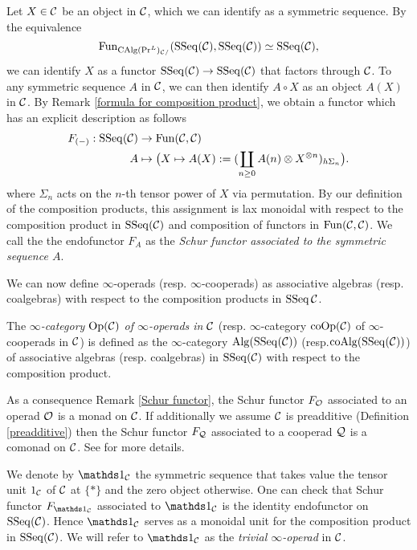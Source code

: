 \begin{remark}
\label{Schur functor}
Let $X \in {\mathcal{C}}$ be an object in ${\mathcal{C}}$, which we can identify as a symmetric sequence.
By the equivalence
$$
\operatorname{Fun}_{\operatorname{CAlg}(\Pr^L)_{{\mathcal{C}}/}}(\operatorname{SSeq}({\mathcal{C}}),\operatorname{SSeq}({\mathcal{C}}))
\simeq
\operatorname{SSeq}({\mathcal{C}}),
$$
we can identify $X$ as a functor $\operatorname{SSeq}({\mathcal{C}}) \to \operatorname{SSeq}({\mathcal{C}})$ that factors through ${\mathcal{C}}$.
To any symmetric sequence $A$ in ${\mathcal{C}}$,  we can then identify $A\circ X$ as an object $A(X)$ in ${\mathcal{C}}$.
By Remark \ref{formula for composition product}, we obtain a functor which has an explicit description as follows
\begin{align*}
		F_{(-)}: \operatorname{SSeq}({\mathcal{C}}) & \rightarrow \operatorname{Fun}({\mathcal{C}},{\mathcal{C}})\\
	A        & \mapsto \big( X\mapsto  A(X):=(\coprod_{n\geq 0} A(n)\otimes X^{\otimes n})_{h\Sigma_n}\big).
\end{align*}
where $\Sigma_n$ acts on the $n$-th tensor power of $X$ via permutation.
By our definition of the composition products, this assignment is lax monoidal with respect to the composition product in $\operatorname{SSeq}({\mathcal{C}})$ and composition of functors in $\operatorname{Fun}({\mathcal{C}},{\mathcal{C}})$.
We call the the endofunctor $F_A$ as the \emph{Schur functor associated to the symmetric sequence $A$}.
\end{remark}

We can now define $\infty$-operads (resp. $\infty$-cooperads) as associative algebras (resp. coalgebras) with respect to the composition products in $\operatorname{SSeq}{{\mathcal{C}}}$.
\begin{definition}
	\label{inf operads}
	The \emph{$\infty$-category $\operatorname{Op}({\mathcal{C}})$ of $\infty$-operads in ${\mathcal{C}}$} (resp. $\infty$-category $\operatorname{coOp}({\mathcal{C}})$ of $\infty$-cooperads in ${\mathcal{C}}$) is defined as the $\infty$-category $\operatorname{Alg}(\operatorname{SSeq}({\mathcal{C}}))$ (resp.$\operatorname{coAlg}(\operatorname{SSeq}({\mathcal{C}}))$) of associative algebras (resp. coalgebras) in $\operatorname{SSeq}({\mathcal{C}})$ with respect to the composition product.
\end{definition}

\begin{remark}
\label{Schur functor and operads}
As a consequence Remark \ref{Schur functor}, the Schur functor $F_{\mathcal{O}}$ associated to an operad ${\mathcal{O}}$ is a monad on ${\mathcal{C}}$.
If additionally we assume ${\mathcal{C}}$ is preadditive (Definition \ref{preadditive})
then the Schur functor $F_{\mathcal{Q}}$ associated to a cooperad ${\mathcal{Q}}$ is a comonad on ${\mathcal{C}}$. See \cite[Remark 2.21]{ChingBar} for more details.
\end{remark}

\begin{example}
    	We denote by $\triv_{\CC}$ the symmetric sequence that takes value the tensor unit $1_{\mathcal{C}}$ of ${\mathcal{C}}$ at $\{*\}$ and the zero object otherwise. One can check that Schur functor $F_{\triv_{\CC}}$ associated to $\triv_{\CC}$ is the identity endofunctor on $\operatorname{SSeq}({\mathcal{C}})$. Hence $\triv_{\CC}$ serves as a monoidal unit for the composition product in $\operatorname{SSeq}({\mathcal{C}})$.
	We will refer to $\triv_{\CC}$ as the \emph{trivial $\infty$-operad} in ${\mathcal{C}}$.
\end{example}


